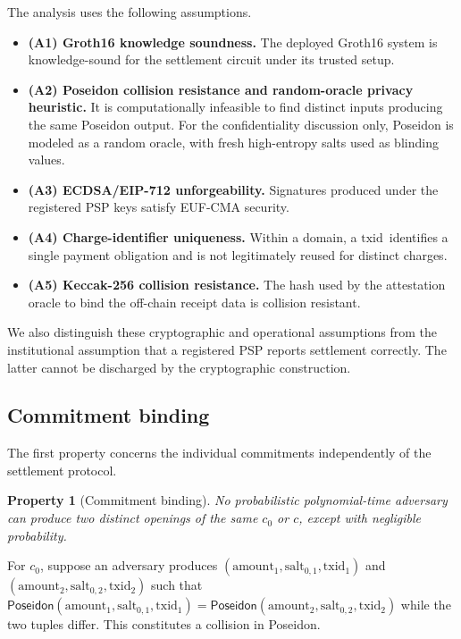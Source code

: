 \documentclass[10pt,twocolumn]{article}
\newtheorem{property}{Property}
\newcommand{\Poseidon}{\ensuremath{\mathsf{Poseidon}}}
\newcommand{\amount}{\ensuremath{\text{amount}}}
\newcommand{\txid}{\ensuremath{\text{txid}}}
\newcommand{\salt}{\ensuremath{\text{salt}}}
\begin{document}
The analysis uses the following assumptions.

\begin{itemize}
\item \textbf{(A1) Groth16 knowledge soundness.} The deployed Groth16
  system is knowledge-sound for the settlement circuit under its trusted
  setup.
\item \textbf{(A2) Poseidon collision resistance and random-oracle
  privacy heuristic.} It is computationally infeasible to find distinct
  inputs producing the same Poseidon output. For the confidentiality
  discussion only, Poseidon is modeled as a random oracle, with fresh
  high-entropy salts used as blinding values.
\item \textbf{(A3) ECDSA/EIP-712 unforgeability.} Signatures produced
  under the registered PSP keys satisfy EUF-CMA security.
\item \textbf{(A4) Charge-identifier uniqueness.} Within a domain, a
  \txid\ identifies a single payment obligation and is not legitimately
  reused for distinct charges.
\item \textbf{(A5) Keccak-256 collision resistance.} The hash used by
  the attestation oracle to bind the off-chain receipt data is collision
  resistant.
\end{itemize}

We also distinguish these cryptographic and operational assumptions from
the institutional assumption that a registered PSP reports settlement
correctly. The latter cannot be discharged by the cryptographic
construction.

\subsection{Commitment binding}

The first property concerns the individual commitments independently of
the settlement protocol.

\begin{property}[Commitment binding]
No probabilistic polynomial-time adversary can produce two distinct
openings of the same $c_0$ or $c$, except with negligible probability.
\end{property}

For $c_0$, suppose an adversary produces
$(\amount_1,\salt_{0,1},\txid_1)$ and $(\amount_2,\salt_{0,2},\txid_2)$
such that
$\Poseidon(\amount_1,\salt_{0,1},\txid_1) = \Poseidon(\amount_2,\salt_{0,2},\txid_2)$
while the two tuples differ. This constitutes a collision in Poseidon.
\end{document}
